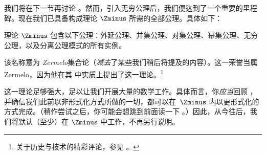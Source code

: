 \documentclass[../../../include/open-logic-section]{subfiles}
\begin{document}

我们将在下一节再讨论 \stagesinf{}。然而，引入无穷公理后，我们便达到了一个重要的里程碑。现在我们已具备构成理论 $\Zminus$ 所需的全部公理。具体如下：

\begin{defn}
理论 $\Zminus$ 包含以下公理：外延公理、并集公理、对集公理、幂集公理、无穷公理，以及分离公理模式的所有实例。
\end{defn}

该名称意为 \emph{Zermelo}集合论（\emph{减去}了某些我们稍后将提及的内容）。这一荣誉当属 Zermelo，因为他在其 \citeyear{Zermelo1908Untersuchungen} 中实质上提出了这一理论。\footnote{关于历史与技术的精彩评论，参见 \citet[附录 A]{Potter2004}。}

这一理论足够强大，足以让我们开展大量的数学工作。具体而言，你\emph{应当}回顾 ，并确信我们此前以非形式化方式所做的一切，都可以在~$\Zminus$ 内以更形式化的方式完成。（稍作尝试之后，你可能会想跳到前面读一下 。）因此，从今往后，我们将默认（至少）在 $\Zminus$ 中工作，不再另行说明。
\end{document}
